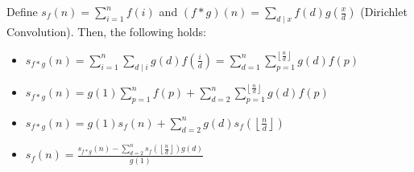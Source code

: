 Define $s_f(n) = \displaystyle \sum_{i = 1}^n f(i)$
and $(f * g)(n) = \displaystyle \sum_{d \mid x} f(d)g(\frac{x}{d})$ (Dirichlet Convolution). Then, the following holds:

\begin{itemize}
    \item $\displaystyle
            s_{f*g}(n) = \sum_{i=1}^{n} \sum_{d \mid i} g(d)f\left(\frac{i}{d}\right) = \sum_{d=1}^{n} \sum_{p=1}^{\left\lfloor \frac{n}{d} \right\rfloor} g(d)f(p)$

    \item $\displaystyle
            s_{f*g}(n) = g(1)\sum_{p=1}^{n}f(p) + \sum_{d=2}^{n}\sum_{p=1}^{\left\lfloor \frac{n}{d} \right\rfloor}g(d)f(p)$

    \item $\displaystyle
            s_{f*g}(n) = g(1)s_f(n) + \sum_{d=2}^{n}g(d)s_f\left(\left\lfloor \frac{n}{d} \right\rfloor\right)$

    \item $\displaystyle
            s_f(n) = \frac{s_{f*g}(n) - \sum_{d=2}^{n}s_f\left(\left\lfloor \frac{n}{d} \right\rfloor\right)g(d)}{g(1)}$
\end{itemize}
